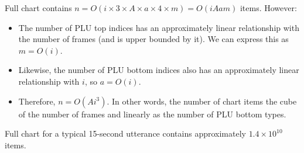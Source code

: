 \documentclass[12pt,letterpaper]{article}
\begin{document}
\noindent Full chart contains $n = O(i \times 3 \times A \times a \times 4 \times m) = O(iAam)$ items. However:
\begin{itemize}
	\item The number of PLU top indices has an approximately linear relationship with the number of frames (and is upper bounded by it). We can express this as $m=O(i)$.
	\item Likewise, the number of PLU bottom indices also has an approximately linear relationship with $i$, so $a=O(i)$. 
	\item Therefore, $n=O(Ai^3)$. In other words, the number of chart items the cube of the number of frames and linearly as the number of PLU bottom types.
\end{itemize}

\noindent Full chart for a typical 15-second utterance contains approximately $1.4 \times 10^{10}$ items.
\end{document}
